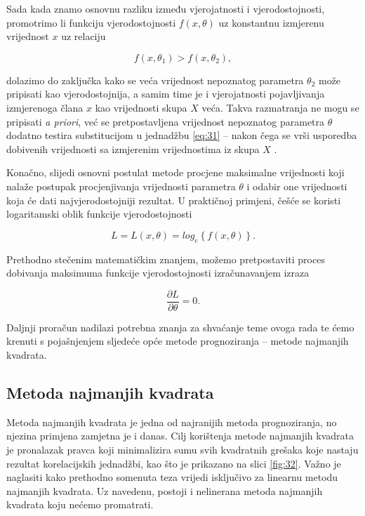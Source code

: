 \documentclass[a4paper,12pt,oneside]{memoir}
\begin{document}
                
                Sada kada znamo osnovnu razliku između vjerojatnosti i vjerodostojnosti, promotrimo li funkciju vjerodostojnosti $f(x,\theta)$ uz konstantnu izmjerenu vrijednost $x$ uz relaciju

                \begin{equation}
                    f(x,\theta_1)>f(x,\theta_2),
                    \label{eq:33}
                \end{equation}

            dolazimo do zaključka kako se veća vrijednost nepoznatog parametra $\theta_2$ može pripisati kao vjerodostojnija, a samim time je i vjerojatnosti pojavljivanja izmjerenoga člana $x$ kao vrijednosti skupa $X$ veća. Takva razmatranja ne mogu se pripisati \textit{a priori}, već se pretpostavljena vrijednost nepoznatog parametra $\theta$ dodatno testira substitucijom u jednadžbu \ref{eq:31} -- nakon čega se vrši usporedba dobivenih vrijednosti sa izmjerenim vrijednostima iz skupa $X$ \cite{Broersen}.

                Konačno, slijedi osnovni postulat metode procjene maksimalne vrijednosti koji nalaže postupak procjenjivanja vrijednosti parametra $\theta$ i odabir one vrijednosti koja će dati najvjerodostojniji rezultat. U praktičnoj primjeni, češće se koristi logaritamski oblik funkcije vjerodostojnosti
                
                \begin{equation}
                    L=L(x,\theta)=log_e\left\{f(x,\theta)\right\}.
                \end{equation}
        
                Prethodno stečenim matematičkim znanjem, možemo pretpostaviti proces dobivanja maksimuma funkcije vjerodostojnosti izračunavanjem izraza
                
                \begin{equation}
                    \frac{\partial L}{\partial \theta}=0.
                \end{equation}
                
                Daljnji proračun nadilazi potrebna znanja za shvaćanje teme ovoga rada te ćemo krenuti s pojašnjenjem sljedeće opće metode prognoziranja -- metode najmanjih kvadrata.

            \subsection{Metoda najmanjih kvadrata}
            \label{subs:LS}
                Metoda najmanjih kvadrata je jedna od najranijih metoda prognoziranja, no njezina primjena zamjetna je i danas. Cilj korištenja metode najmanjih kvadrata je pronalazak pravca koji minimalizira sumu svih kvadratnih grešaka koje nastaju rezultat korelacijskih jednadžbi, kao što je prikazano na slici \ref{fig:32}. Važno je naglasiti kako prethodno somenuta teza vrijedi isključivo za linearnu metodu najmanjih kvadrata. Uz navedenu, postoji i nelinerana metoda najmanjih kvadrata koju nećemo promatrati.
\end{document}
